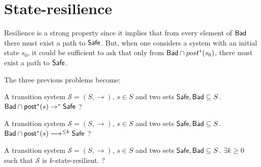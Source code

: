 



\section{State-resilience}


Resilience is a strong property since it implies that from every element of $\textsf{Bad}$ there must exist a path to $\textsf{Safe}$. But, when one considers a system with an initial state $s_0$, it could be sufficient to ask that only from $\textsf{Bad} \cap post^*(s_0)$, there must exist a path to $\textsf{Safe}$. 
%
%
%


The three previous problems become:


{A transition system $\mathscr{S}=(S,\rightarrow)$, $s \in S$ and two sets $\textsf{Safe}, \textsf{Bad} \subseteq S$.}
{$\textsf{Bad} \cap \textsf{post}^*(s)  \rightarrow^{*} \textsf{Safe} $ ? \newline}


{A transition system $\mathscr{S}=(S,\rightarrow)$, $s \in S$ and two sets $\textsf{Safe}, \textsf{Bad} \subseteq S$.}
{ $\textsf{Bad} \cap \textsf{post}^*(s) \longrightarrow^{\leq k} \textsf{Safe}$ ?  \newline}
%

{A transition system $\mathscr{S}=(S,\rightarrow)$, $s \in S$ and two sets $\textsf{Safe}, \textsf{Bad} \subseteq S$.}
{$\exists k \geq 0$ such that $\mathscr{S}$ is $k$-state-resilient. ?\newline}


